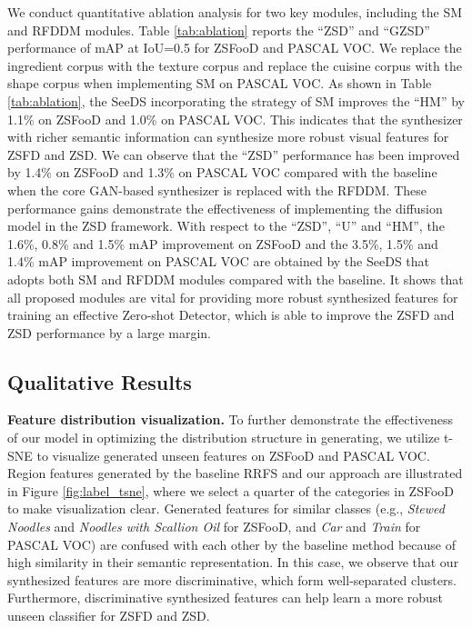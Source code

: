 We conduct quantitative ablation analysis for two key modules, including the SM and RFDDM modules. Table \ref{tab:ablation} reports the ``ZSD'' and ``GZSD'' performance of mAP at IoU=0.5 for ZSFooD and PASCAL VOC. We replace the ingredient corpus with the texture corpus and replace the cuisine corpus with the shape corpus when implementing SM on PASCAL VOC. As shown in Table \ref{tab:ablation}, the SeeDS incorporating the strategy of SM improves the ``HM'' by 1.1\% on ZSFooD and 1.0\% on PASCAL VOC. This indicates that the synthesizer with richer semantic information can synthesize more robust visual features for ZSFD and ZSD. We can observe that the ``ZSD'' performance has been improved by 1.4\% on ZSFooD and 1.3\% on PASCAL VOC compared with the baseline when the core GAN-based synthesizer is replaced with the RFDDM. These performance gains demonstrate the effectiveness of implementing the diffusion model in the ZSD framework. With respect to the ``ZSD'', ``U'' and ``HM'', the 1.6\%, 0.8\% and 1.5\% mAP improvement on ZSFooD and the 3.5\%, 1.5\% and 1.4\% mAP improvement on PASCAL VOC are obtained by the SeeDS that adopts both SM and RFDDM modules compared with the baseline. It shows that all proposed modules are vital for providing more robust synthesized features for training an effective Zero-shot Detector, which is able to improve the ZSFD and ZSD performance by a large margin.

\subsection{Qualitative Results}
\label{sec:qualitative}

\noindent\textbf{Feature distribution visualization.}
To further demonstrate the effectiveness of our model in optimizing the distribution structure in generating, we utilize t-SNE \cite{van2008visualizing} to visualize generated unseen features on ZSFooD and PASCAL VOC. Region features generated by the baseline RRFS and our approach are illustrated in Figure \ref{fig:label_tsne}, where we select a quarter of the categories in ZSFooD to make visualization clear. Generated features for similar classes (e.g., \emph{Stewed Noodles} and \emph{Noodles with Scallion Oil} for ZSFooD, and \emph{Car} and \emph{Train} for PASCAL VOC) are confused with each other by the baseline method because of high similarity in their semantic representation. In this case, we observe that our synthesized features are more discriminative, which form well-separated clusters. Furthermore, discriminative synthesized features can help learn a more robust unseen classifier for ZSFD and ZSD.

